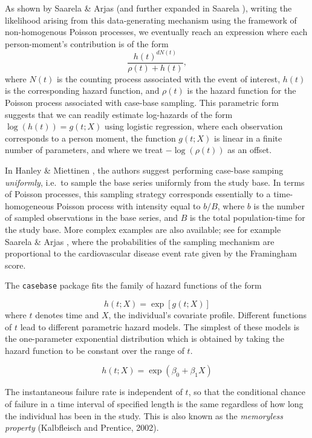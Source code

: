 \documentclass[
]{jss}
\begin{document}
As shown by Saarela \& Arjas \citeyearpar{saarela2015non} (and further
expanded in Saarela \citeyearpar{saarela2016case}), writing the
likelihood arising from this data-generating mechanism using the
framework of non-homogenous Poisson processes, we eventually reach an
expression where each person-moment's contribution is of the form
\[\frac{h(t)^{dN(t)}}{\rho(t) + h(t)},\] where \(N(t)\) is the counting
process associated with the event of interest, \(h(t)\) is the
corresponding hazard function, and \(\rho(t)\) is the hazard function
for the Poisson process associated with case-base sampling. This
parametric form suggests that we can readily estimate log-hazards of the
form \(\log(h(t)) = g(t; X)\) using logistic regression, where each
observation corresponds to a person moment, the function \(g(t; X)\) is
linear in a finite number of parameters, and where we treat
\(-\log(\rho(t))\) as an offset.

In Hanley \& Miettinen \citeyearpar{hanley2009fitting}, the authors
suggest performing case-base samping \emph{uniformly}, i.e.~to sample
the base series uniformly from the study base. In terms of Poisson
processes, this sampling strategy corresponds essentially to a
time-homogeneous Poisson process with intensity equal to \(b/B\), where
\(b\) is the number of sampled observations in the base series, and
\(B\) is the total population-time for the study base. More complex
examples are also available; see for example Saarela \& Arjas
\citeyearpar{saarela2015non}, where the probabilities of the sampling
mechanism are proportional to the cardiovascular disease event rate
given by the Framingham score.

The \texttt{casebase} package fits the family of hazard functions of the
form

\[ h(t;X) = \exp[g(t;X)] \] where \(t\) denotes time and \(X\), the
individual's covariate profile. Different functions of \(t\) lead to
different parametric hazard models. The simplest of these models is the
one-parameter exponential distribution which is obtained by taking the
hazard function to be constant over the range of \(t\).

\[ h(t;X) = \exp(\beta_0 + \beta_1 X) \]

The instantaneous failure rate is independent of \(t\), so that the
conditional chance of failure in a time interval of specified length is
the same regardless of how long the individual has been in the study.
This is also known as the \emph{memoryless property} (Kalbfleisch and
Prentice, 2002).
\end{document}
